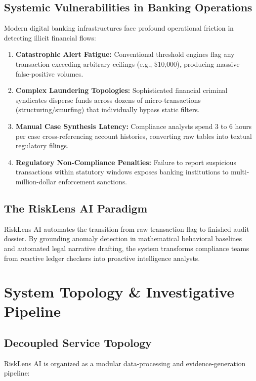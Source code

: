 \documentclass[12pt,a4paper]{report}
\begin{document}
\section{Systemic Vulnerabilities in Banking Operations}
Modern digital banking infrastructures face profound operational friction in detecting illicit financial flows:
\begin{enumerate}[nosep]
    \item \textbf{Catastrophic Alert Fatigue:} Conventional threshold engines flag any transaction exceeding arbitrary ceilings (e.g., \$10,000), producing massive false-positive volumes.
    \item \textbf{Complex Laundering Topologies:} Sophisticated financial criminal syndicates disperse funds across dozens of micro-transactions (structuring/smurfing) that individually bypass static filters.
    \item \textbf{Manual Case Synthesis Latency:} Compliance analysts spend 3 to 6 hours per case cross-referencing account histories, converting raw tables into textual regulatory filings.
    \item \textbf{Regulatory Non-Compliance Penalties:} Failure to report suspicious transactions within statutory windows exposes banking institutions to multi-million-dollar enforcement sanctions.
\end{enumerate}

\section{The RiskLens AI Paradigm}
RiskLens AI automates the transition from raw transaction flag to finished audit dossier. By grounding anomaly detection in mathematical behavioral baselines and automated legal narrative drafting, the system transforms compliance teams from reactive ledger checkers into proactive intelligence analysts.

\chapter{System Topology \& Investigative Pipeline}

\section{Decoupled Service Topology}
RiskLens AI is organized as a modular data-processing and evidence-generation pipeline:
\end{document}
